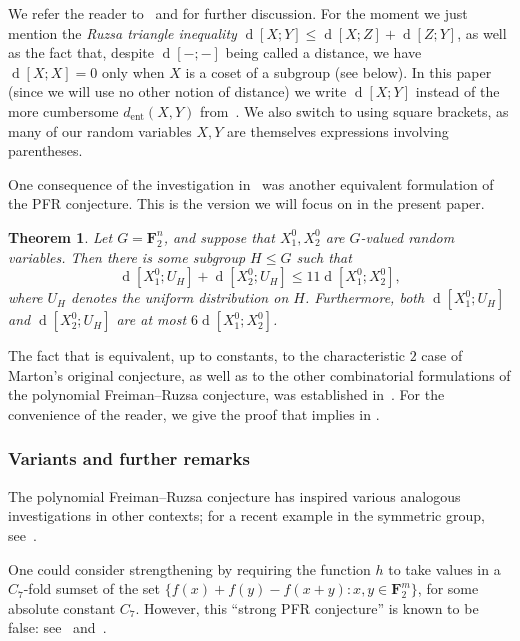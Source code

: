 \documentclass[12pt,reqno,tbtags]{amsart}
\newtheorem{theorem}{Theorem}[section]
\theoremstyle{definition}
\theoremstyle{remark}
\renewcommand{\leq}{\leqslant}
\renewcommand{\le}{\leq}
\def\F{\mathbf{F}}
\newcommand{\dist}[2]{{\operatorname{d}[#1;#2]}} %
\numberwithin{equation}{section}
\begin{document}
We refer the reader to~\cite[Section 1]{gmt} and  for further discussion. For the moment we just mention the \emph{Ruzsa triangle inequality} $\dist{X}{Y} \leq \dist{X}{Z} + \dist{Z}{Y}$, as well as the fact that, despite $\dist{-}{-}$ being called a distance, we have $\dist{X}{X} = 0$ only when $X$ is a coset of a subgroup (see  below). In this paper (since we will use no other notion of distance) we write $\dist{X}{Y}$ instead of the more cumbersome $d_{\mathrm{ent}}(X,Y)$ from~\cite{gmt}.
We also switch to using square brackets, as many of our random variables $X, Y$ are themselves expressions involving parentheses.

One consequence of the investigation in~\cite{gmt} was another equivalent formulation of the PFR conjecture. This is the version we will focus on in the present paper.

\begin{theorem}\label{pfr-entropy}
  Let $G = \F_2^n$, and suppose that $X^0_1, X^0_2$ are $G$-valued random variables.
  Then there is some subgroup $H \leq G$ such that
  \[
    \dist{X^0_1}{U_H} + \dist{X^0_2}{U_H} \le 11\dist{X^0_1}{X^0_2},
  \]
  where $U_H$ denotes the uniform distribution on $H$.
  Furthermore, both $\dist{X^0_1}{U_H}$ and $\dist{X^0_2}{U_H}$ are at most $6 \dist{X^0_1}{X^0_2}$.
\end{theorem}

The fact that  is equivalent, up to constants, to the characteristic $2$ case of Marton's original conjecture, as well as to the other combinatorial formulations of the polynomial Freiman--Ruzsa conjecture, was established in~\cite[Section 8]{gmt}.  For the convenience of the reader, we give the proof that  implies  in .

\subsubsection*{Variants and further remarks}
The polynomial Freiman--Ruzsa conjecture has inspired various analogous investigations in other contexts; for a recent example in the symmetric group, see~\cite{keevash-lifshitz}.


One could consider strengthening  by requiring the function $h$ to take values in a $C_7$-fold sumset of the set $\{ f(x)+f(y)-f(x+y): x,y \in \F_2^m\}$, for some absolute constant $C_7$.
However, this ``strong PFR conjecture'' is known to be false: see~\cite{aaronson} and~\cite[Section 1.17]{tao-poincare}.
\end{document}
